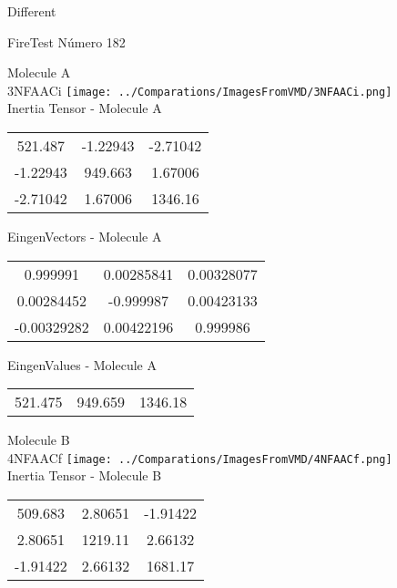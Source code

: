 \begin{center}
\vtab
\vtab
\textcolor{NavyBlue}{\Large Different}
\end{center}

 \newpage

\vtab[-2cm]
\begin{center}
{\large FireTest \tab Número 182}
\end{center}
\begin{multicols}{2}
\begin{center}

Molecule A \\ 
3NFAACi
\texttt{[image: ../Comparations/ImagesFromVMD/3NFAACi.png]}
\\
Inertia Tensor - Molecule A \\
\vtab

\begin{tabular}{|c c c|}
521.487	 & 	-1.22943	 & 	-2.71042	 \\
-1.22943	 & 	949.663	 & 	1.67006	 \\
-2.71042	 & 	1.67006	 & 	1346.16
\end{tabular}

\vtab
 EingenVectors - Molecule A     \\
\vtab
\begin{tabular}{|c c c|}
0.999991	 & 	0.00285841	 & 	0.00328077	 \\
0.00284452	 & 	-0.999987	 & 	0.00423133	 \\
-0.00329282	 & 	0.00422196	 & 	0.999986
\end{tabular}

\vtab
 EingenValues - Molecule A     \\
\vtab
\begin{tabular}{|c c c|}
521.475	 & 	949.659	 & 	1346.18	 \\
\end{tabular}
\columnbreak

Molecule B \\ 
4NFAACf
\texttt{[image: ../Comparations/ImagesFromVMD/4NFAACf.png]}
\\
Inertia Tensor - Molecule B \\
\vtab

\begin{tabular}{|c c c|}
509.683	 & 	2.80651	 & 	-1.91422	 \\
2.80651	 & 	1219.11	 & 	2.66132	 \\
-1.91422	 & 	2.66132	 & 	1681.17
\end{tabular}


\end{center}
\end{multicols}
